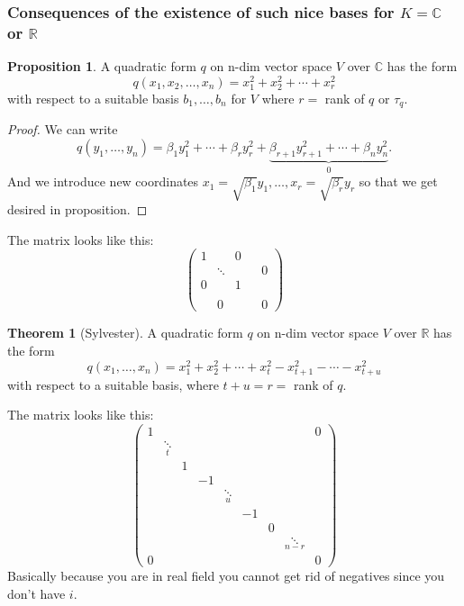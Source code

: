 \documentclass[a4paper]{article}
\theoremstyle{definition}
\newtheorem{prop}[defn]{Proposition}
\newtheorem{thm}[defn]{Theorem}
\begin{document}
\subsubsection{Consequences of the existence of such nice bases for $K=\mathbb C$ or $\mathbb R$}
\begin{prop}
A quadratic form $q$ on n-dim vector space $V$ over $\mathbb C$ has the form
\[
q(x_1,x_2,\ldots,x_n)=x_1^2+x_2^2+\cdots+x_r^2
\]
with respect to a suitable basis $b_1,\ldots,b_n$ for $V$ where $r=$ rank of $q$ or $\tau_q$.
\end{prop}
\begin{proof}
We can write
\[
q(y_1,\ldots,y_n)=\beta_1 y_1^2+\cdots+\beta_r y_r^2+\underbrace{\beta_{r+1}y_{r+1}^2 +\cdots +\beta_n y_n^2}_0 .
\]
And we introduce new coordinates $x_1=\sqrt{\beta_1}y_1,\ldots,x_r=\sqrt{\beta_r}y_r$ so that we get desired in proposition.
\end{proof}
The matrix looks like this:
\[
\begin{pmatrix}
1 &  & 0 \\ & \ddots & & & 0 \\ 0 & & 1 \\ \\ & 0 & & & 0
\end{pmatrix}
\]
\begin{thm}[Sylvester]
A quadratic form $q$ on n-dim vector space $V$ over $\mathbb R$ has the form
\[
q(x_1,\ldots,x_n) = x_1^2+x_2^2+\cdots+x_t^2-x_{t+1}^2-\cdots -x_{t+u}^2
\]
with respect to a suitable basis, where $t+u=r=$ rank of $q$.
\end{thm}
The matrix looks like this:
\[
\begin{pmatrix}
1 &&&&&&&&0 \\ & \underset{t}{\ddots} \\ && 1 \\ &&& -1 \\ &&&& \underset{u}{\ddots} \\ &&&&& -1 \\ &&&&&& 0 \\ &&&&&&& \underset{n-r}{\ddots}\\ 0&&&&&&&& 0
\end{pmatrix}
\]
Basically because you are in real field you cannot get rid of negatives since you don't have $i$.
\end{document}
